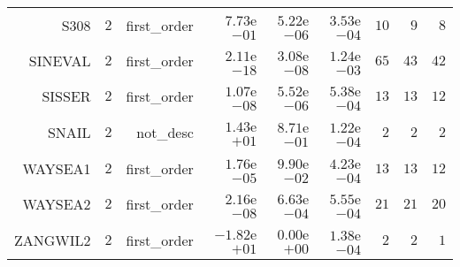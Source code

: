 \begin{longtable}{rrrrrrrrr}
S308 & \(     2\) & first\_order & \( 7.73\)e\(-01\) & \( 5.22\)e\(-06\) & \( 3.53\)e\(-04\) & \(    10\) & \(     9\) & \(     8\) \\
SINEVAL & \(     2\) & first\_order & \( 2.11\)e\(-18\) & \( 3.08\)e\(-08\) & \( 1.24\)e\(-03\) & \(    65\) & \(    43\) & \(    42\) \\
SISSER & \(     2\) & first\_order & \( 1.07\)e\(-08\) & \( 5.52\)e\(-06\) & \( 5.38\)e\(-04\) & \(    13\) & \(    13\) & \(    12\) \\
SNAIL & \(     2\) & not\_desc & \( 1.43\)e\(+01\) & \( 8.71\)e\(-01\) & \( 1.22\)e\(-04\) & \(     2\) & \(     2\) & \(     2\) \\
WAYSEA1 & \(     2\) & first\_order & \( 1.76\)e\(-05\) & \( 9.90\)e\(-02\) & \( 4.23\)e\(-04\) & \(    13\) & \(    13\) & \(    12\) \\
WAYSEA2 & \(     2\) & first\_order & \( 2.16\)e\(-08\) & \( 6.63\)e\(-04\) & \( 5.55\)e\(-04\) & \(    21\) & \(    21\) & \(    20\) \\
ZANGWIL2 & \(     2\) & first\_order & \(-1.82\)e\(+01\) & \( 0.00\)e\(+00\) & \( 1.38\)e\(-04\) & \(     2\) & \(     2\) & \(     1\) \\\hline
\end{longtable}
